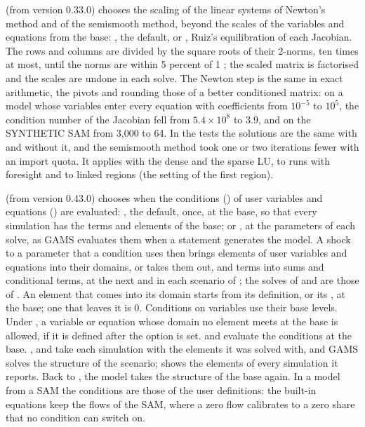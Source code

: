 \begin{optdesc}
\item[\optarg{sca}{ling}{none|ruiz}] (from version 0.33.0) chooses the
scaling of the linear systems of Newton's method and of the semismooth
method, beyond the scales of the variables and equations from the base:
, the default, or , Ruiz's equilibration of each
Jacobian. The rows and columns are divided by the square roots of their
2-norms, ten times at most, until the norms are within 5 percent of 1
\citep{ruiz2001}; the scaled matrix is factorised and the scales are undone in
each solve. The Newton step is the same in exact arithmetic, the pivots and
rounding those of a better conditioned matrix: on a model whose variables
enter every equation with coefficients from $10^{-5}$ to $10^{5}$, the
condition number of the Jacobian fell from $5.4\times10^{8}$ to 3.9, and on
the SYNTHETIC SAM from 3,000 to 64. In the tests the solutions are the same
with and without it, and the semismooth method took one or two iterations
fewer with an import quota. It applies with the dense and the sparse LU, to
runs with foresight and to linked regions (the setting of the first region).

\item[\optarg{cond}{itions}{base|solve}] (from version 0.43.0) chooses when
the conditions (\cmd{$}) of user variables and equations
() are evaluated: , the default, once, at the
base, so that every simulation has the terms and elements of the base; or
, at the parameters of each solve, as GAMS evaluates them when a
 statement generates the model. A shock to a parameter that a
condition uses then brings elements of user variables and equations into
their domains, or takes them out, and terms into sums and conditional
terms, at the next  and in each scenario of
; the solves of  and
 are those of . An element that comes into
its domain starts from its definition, or its , at the base;
one that leaves it is 0. Conditions on variables use their base levels.
Under , a variable or equation whose domain no element meets at
the base is allowed, if it is defined after the option is set.
 and  evaluate the conditions at
the base. ,  and 
take each simulation with the elements it was solved with, and GAMS solves
the structure of the scenario;  shows the elements of
every simulation it reports. Back to , the
model takes the structure of the base again. In a model from a SAM the
conditions are those of the user definitions: the built-in equations keep
the flows of the SAM, where a zero flow calibrates to a zero share that no
condition can switch on.


\end{optdesc}
